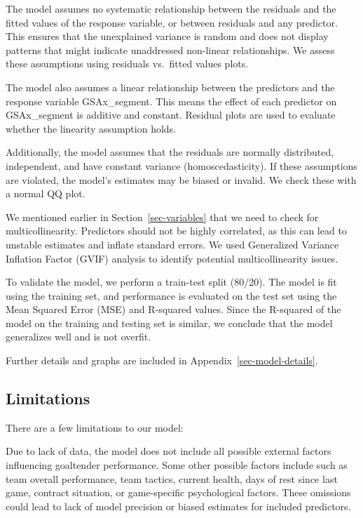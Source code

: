 \documentclass[
  letterpaper,
  DIV=11,
  numbers=noendperiod]{scrartcl}
\begin{document}
The model assumes no systematic relationship between the residuals and
the fitted values of the response variable, or between residuals and any
predictor. This ensures that the unexplained variance is random and does
not display patterns that might indicate unaddressed non-linear
relationships. We assess these assumptions using residuals vs.~fitted
values plots.

The model also assumes a linear relationship between the predictors and
the response variable GSAx\_segment. This means the effect of each
predictor on GSAx\_segment is additive and constant. Residual plots are
used to evaluate whether the linearity assumption holds.

Additionally, the model assumes that the residuals are normally
distributed, independent, and have constant variance (homoscedasticity).
If these assumptions are violated, the model's estimates may be biased
or invalid. We check these with a normal QQ plot.

We mentioned earlier in Section~\ref{sec-variables} that we need to
check for multicollinearity. Predictors should not be highly correlated,
as this can lead to unstable estimates and inflate standard errors. We
used Generalized Variance Inflation Factor (GVIF) analysis to identify
potential multicollinearity issues.

To validate the model, we perform a train-test split (80/20). The model
is fit using the training set, and performance is evaluated on the test
set using the Mean Squared Error (MSE) and R-squared values. Since the
R-squared of the model on the training and testing set is similar, we
conclude that the model generalizes well and is not overfit.

Further details and graphs are included in
Appendix~\ref{sec-model-details}.

\subsection{Limitations}\label{limitations}

There are a few limitations to our model:

Due to lack of data, the model does not include all possible external
factors influencing goaltender performance. Some other possible factors
include such as team overall performance, team tactics, current health,
days of rest since last game, contract situation, or game-specific
psychological factors. These omissions could lead to lack of model
precision or biased estimates for included predictors.
\end{document}
